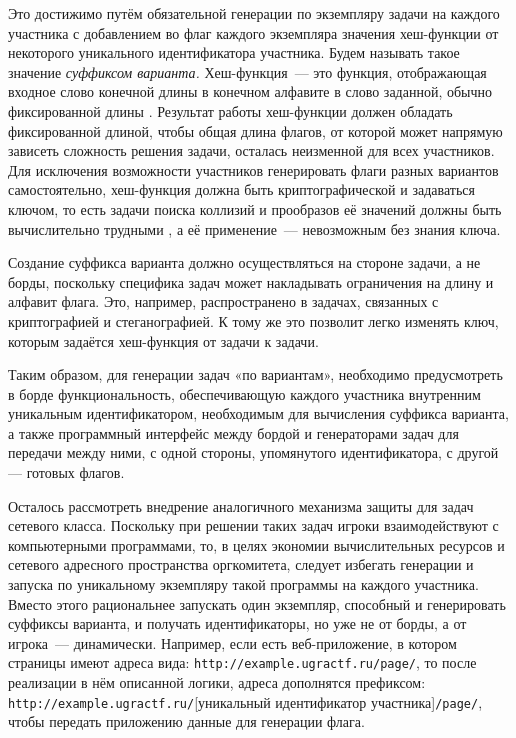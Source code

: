 Это достижимо путём обязательной генерации по экземпляру задачи на каждого участника с добавлением во флаг каждого экземпляра значения хеш-функции от некоторого уникального идентификатора участника. Будем называть такое значение \textit{суффиксом варианта.} Хеш-функция~--- это функция, отображающая входное слово конечной длины в конечном алфавите в слово заданной, обычно фиксированной длины \cite{Cryptodict}. Результат работы хеш-функции должен обладать фиксированной длиной, чтобы общая длина флагов, от которой может напрямую зависеть сложность решения задачи, осталась неизменной для всех участников. Для исключения возможности участников генерировать флаги разных вариантов самостоятельно, хеш-функция должна быть криптографической и задаваться ключом, то есть задачи поиска коллизий и прообразов её значений должны быть вычислительно трудными \cite{Cryptodict}, а её применение~--- невозможным без знания ключа.

Создание суффикса варианта должно осуществляться на стороне задачи, а не борды, поскольку специфика задач может накладывать ограничения на длину и алфавит флага. Это, например, распространено в задачах, связанных с криптографией и стеганографией. К тому же это позволит легко изменять ключ, которым задаётся хеш-функция от задачи к задачи.

Таким образом, для генерации задач «по вариантам», необходимо предусмотреть в борде функциональность, обеспечивающую каждого участника внутренним уникальным идентификатором, необходимым для вычисления суффикса варианта, а также программный интерфейс между бордой и генераторами задач для передачи между ними, с одной стороны, упомянутого идентификатора, с другой — готовых флагов.

Осталось рассмотреть внедрение аналогичного механизма защиты для задач сетевого класса. Поскольку при решении таких задач игроки взаимодействуют с компьютерными программами, то, в целях экономии вычислительных ресурсов и сетевого адресного пространства оргкомитета, следует избегать генерации и запуска по уникальному экземпляру такой программы на каждого участника. Вместо этого рациональнее запускать один экземпляр, способный и генерировать суффиксы варианта, и получать идентификаторы, но уже не от борды, а от игрока~--- динамически. Например, если есть веб-приложение, в котором страницы имеют адреса вида: \texttt{http://example.ugractf.ru/page/}, то после реализации в нём описанной логики, адреса дополнятся префиксом: \texttt{http://example.ugractf.ru/}[уникальный идентификатор участника]\texttt{/page/}, чтобы передать приложению данные для генерации флага.

